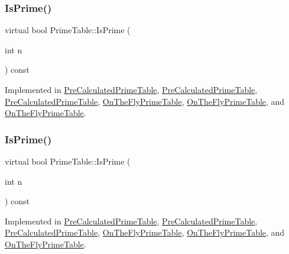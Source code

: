 \subsubsection{\texorpdfstring{IsPrime()}{IsPrime()}\hspace{0.1cm}{\footnotesize\ttfamily [1/3]}}
{\footnotesize\ttfamily virtual bool Prime\+Table\+::\+Is\+Prime (\begin{DoxyParamCaption}\item[{int}]{n }\end{DoxyParamCaption}) const\hspace{0.3cm}{\ttfamily [pure virtual]}}



Implemented in \mbox{\hyperlink{class_pre_calculated_prime_table_a62be946777f7f98bbfc01edc0f15a4bb}{Pre\+Calculated\+Prime\+Table}}, \mbox{\hyperlink{class_pre_calculated_prime_table_a62be946777f7f98bbfc01edc0f15a4bb}{Pre\+Calculated\+Prime\+Table}}, \mbox{\hyperlink{class_pre_calculated_prime_table_a8a9ab7f99b09e5e987933c260e7304cf}{Pre\+Calculated\+Prime\+Table}}, \mbox{\hyperlink{class_on_the_fly_prime_table_ac8236514299e4558a5220c3e06f7f61a}{On\+The\+Fly\+Prime\+Table}}, \mbox{\hyperlink{class_on_the_fly_prime_table_ac8236514299e4558a5220c3e06f7f61a}{On\+The\+Fly\+Prime\+Table}}, and \mbox{\hyperlink{class_on_the_fly_prime_table_a1d49b78f79e018441289e79d75680067}{On\+The\+Fly\+Prime\+Table}}.

\mbox{\label{class_prime_table_a2ab9243364ded0c51541f641b2df362a}} 
\subsubsection{\texorpdfstring{IsPrime()}{IsPrime()}\hspace{0.1cm}{\footnotesize\ttfamily [2/3]}}
{\footnotesize\ttfamily virtual bool Prime\+Table\+::\+Is\+Prime (\begin{DoxyParamCaption}\item[{int}]{n }\end{DoxyParamCaption}) const\hspace{0.3cm}{\ttfamily [pure virtual]}}



Implemented in \mbox{\hyperlink{class_pre_calculated_prime_table_a62be946777f7f98bbfc01edc0f15a4bb}{Pre\+Calculated\+Prime\+Table}}, \mbox{\hyperlink{class_pre_calculated_prime_table_a62be946777f7f98bbfc01edc0f15a4bb}{Pre\+Calculated\+Prime\+Table}}, \mbox{\hyperlink{class_pre_calculated_prime_table_a8a9ab7f99b09e5e987933c260e7304cf}{Pre\+Calculated\+Prime\+Table}}, \mbox{\hyperlink{class_on_the_fly_prime_table_ac8236514299e4558a5220c3e06f7f61a}{On\+The\+Fly\+Prime\+Table}}, \mbox{\hyperlink{class_on_the_fly_prime_table_ac8236514299e4558a5220c3e06f7f61a}{On\+The\+Fly\+Prime\+Table}}, and \mbox{\hyperlink{class_on_the_fly_prime_table_a1d49b78f79e018441289e79d75680067}{On\+The\+Fly\+Prime\+Table}}.

